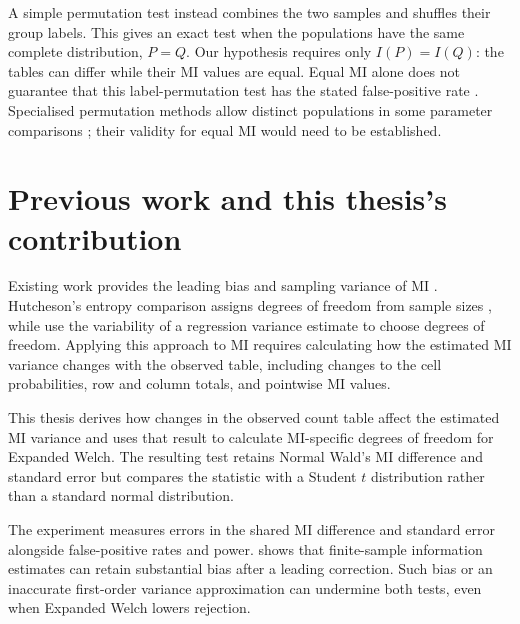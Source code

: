 A simple permutation test instead combines the two samples and shuffles
their group labels. This gives an exact test when
the populations have the same complete distribution, \(P=Q\). Our hypothesis
requires only \(I(P)=I(Q)\): the tables can differ while their MI values are
equal. Equal MI alone does not guarantee that this label-permutation test
has the stated false-positive rate \citep{chung2013}.
Specialised permutation methods allow distinct
populations in some parameter comparisons \citep{janssen1997,chung2013};
their validity for equal MI would need to be established.

\section{Previous work and this thesis's contribution}

Existing work provides the leading bias and sampling variance of MI
\citep{miller1955,moddemeijer1989,brillinger2004,paninski2003}.
Hutcheson's entropy comparison assigns degrees of freedom from sample sizes
\citep{hutcheson1970}, while \citet{panwall2002} use the variability of a
regression variance estimate to choose degrees of freedom. Applying this
approach to MI requires calculating how the estimated MI variance changes
with the observed table, including changes to the cell probabilities,
row and column totals, and pointwise MI values.

This thesis derives how changes in the observed count table affect the
estimated MI variance and uses that result to calculate MI-specific degrees
of freedom for Expanded Welch. The resulting test retains Normal Wald's MI
difference and standard error but compares the statistic with a Student
\(t\) distribution rather than a standard normal distribution.

The experiment measures errors in the shared MI difference and standard
error alongside false-positive rates and power.
\citet{paninski2003} shows that finite-sample information estimates can
retain substantial bias after a leading correction. Such bias or an
inaccurate first-order variance approximation can undermine both tests,
even when Expanded Welch lowers rejection.
